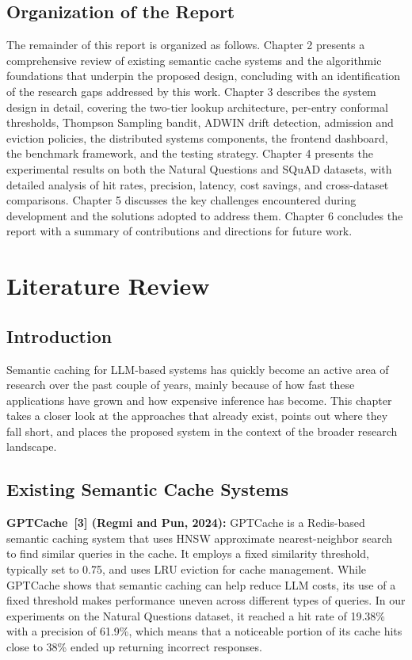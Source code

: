 \documentclass[12pt,a4paper]{report}
\begin{document}
\section{Organization of the Report}

The remainder of this report is organized as follows. Chapter 2 presents a comprehensive review of existing semantic cache systems and the algorithmic foundations that underpin the proposed design, concluding with an identification of the research gaps addressed by this work. Chapter 3 describes the system design in detail, covering the two-tier lookup architecture, per-entry conformal thresholds, Thompson Sampling bandit, ADWIN drift detection, admission and eviction policies, the distributed systems components, the frontend dashboard, the benchmark framework, and the testing strategy. Chapter 4 presents the experimental results on both the Natural Questions and SQuAD datasets, with detailed analysis of hit rates, precision, latency, cost savings, and cross-dataset comparisons. Chapter 5 discusses the key challenges encountered during development and the solutions adopted to address them. Chapter 6 concludes the report with a summary of contributions and directions for future work.


\chapter{Literature Review}

\section{Introduction}

Semantic caching for LLM-based systems has quickly become an active area of research over the past couple of years, mainly because of how fast these applications have grown and how expensive inference has become. This chapter takes a closer look at the approaches that already exist, points out where they fall short, and places the proposed system in the context of the broader research landscape.


\section{Existing Semantic Cache Systems}

\textbf{GPTCache~[3] (Regmi and Pun, 2024):} GPTCache is a Redis-based semantic caching system that uses HNSW approximate nearest-neighbor search to find similar queries in the cache. It employs a fixed similarity threshold, typically set to 0.75, and uses LRU eviction for cache management. While GPTCache shows that semantic caching can help reduce LLM costs, its use of a fixed threshold makes performance uneven across different types of queries. In our experiments on the Natural Questions dataset, it reached a hit rate of 19.38\% with a precision of 61.9\%, which means that a noticeable portion of its cache hits close to 38\% ended up returning incorrect responses.
\end{document}
